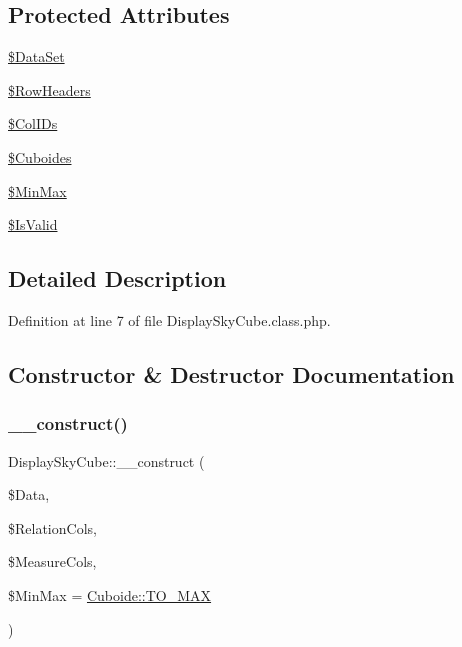 \subsection*{Protected Attributes}
\begin{DoxyCompactItemize}
\item 
\hyperlink{class_display_sky_cube_ae2ae6b33b0e758d89cc2704ba91216a0}{\$\+Data\+Set}
\item 
\hyperlink{class_display_sky_cube_a2888c991ea3c2ce95dec06ea415babfd}{\$\+Row\+Headers}
\item 
\hyperlink{class_display_sky_cube_af896f9ca7972c3bfbd771fe17e2bfa8d}{\$\+Col\+I\+Ds}
\item 
\hyperlink{class_display_sky_cube_ae2a8e341aaf25186b81054b30696b1e1}{\$\+Cuboides}
\item 
\hyperlink{class_display_sky_cube_aeb94af511f3e808ed02ab93e6b3cf7f2}{\$\+Min\+Max}
\item 
\hyperlink{class_display_sky_cube_af674a72b3d6c9fc3b2848691b4b00905}{\$\+Is\+Valid}
\end{DoxyCompactItemize}


\subsection{Detailed Description}


Definition at line 7 of file Display\+Sky\+Cube.\+class.\+php.



\subsection{Constructor \& Destructor Documentation}
\mbox{\label{class_display_sky_cube_af33927a125f0e2b5a2eb7aea75b68b6b}} 
\subsubsection{\texorpdfstring{\+\_\+\+\_\+construct()}{\_\_construct()}}
{\footnotesize\ttfamily Display\+Sky\+Cube\+::\+\_\+\+\_\+construct (\begin{DoxyParamCaption}\item[{}]{\$\+Data,  }\item[{}]{\$\+Relation\+Cols,  }\item[{}]{\$\+Measure\+Cols,  }\item[{}]{\$\+Min\+Max = {\ttfamily \hyperlink{class_cuboide_afd49ea48fafb0362d27f78f6f4ef8b84}{Cuboide\+::\+T\+O\+\_\+\+M\+AX}} }\end{DoxyParamCaption})}




